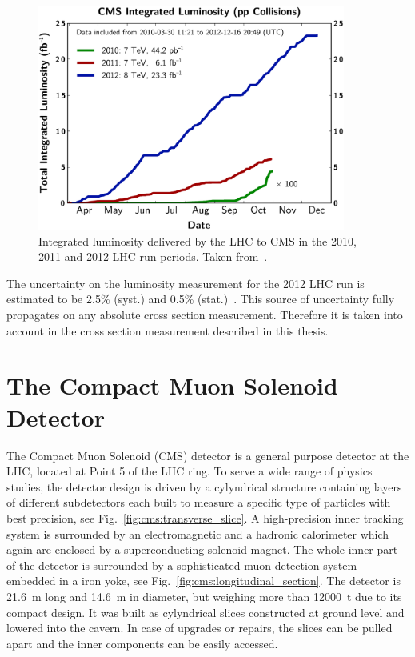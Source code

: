 \begin{figure}[htp]
    \centering
    \includegraphics[width=0.9\textwidth]{figures/cms_detector/lumi_integrated.pdf}
    \caption[Integrated luminosity delivered to CMS]{Integrated luminosity
        delivered by the LHC to CMS in the 2010, 2011 and 2012 LHC run periods.
        Taken from~\cite{Berger:2014aca}.}
    \label{fig:cms:lumi_integrated}
\end{figure}

The uncertainty on the luminosity measurement for the 2012 LHC run is estimated
to be 2.5\% (syst.) and 0.5\% (stat.)~\cite{CMS-PAS-LUM-13-001}. This source of
uncertainty fully propagates on any absolute cross section measurement.
Therefore it is taken into account in the cross section measurement
described in this thesis.

\section{The Compact Muon Solenoid Detector}

The Compact Muon Solenoid (CMS) detector is a general purpose detector at the
LHC, located at Point 5 of the LHC ring. To serve a wide range of physics
studies, the detector design is driven by a cylyndrical structure containing
layers of different subdetectors each built to measure a specific type of
particles with best precision, see Fig.~\ref{fig:cms:transverse_slice}. A
high-precision inner tracking system is surrounded by an electromagnetic and a
hadronic calorimeter which again are enclosed by a superconducting solenoid
magnet. The whole inner part of the detector is surrounded by a sophisticated
muon detection system embedded in a iron yoke, see
Fig.~\ref{fig:cms:longitudinal_section}. The detector is \SI{21.6}{\meter}
long and \SI{14.6}{\meter} in diameter, but weighing more than
\SI{12000}{\tonne} due to its compact design.  It was built as cylyndrical
slices constructed at ground level and lowered into the cavern. In case of
upgrades or repairs, the slices can be pulled apart and the inner components can
be easily accessed.

